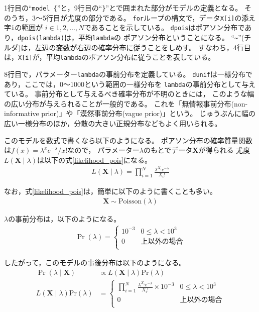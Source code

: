 \documentclass[11pt,uplatex]{jsarticle}
\begin{document}
1行目の``\texttt{model \{}''と，9行目の``\texttt{\}}''とで囲まれた部分がモデルの定義となる。
そのうち，3〜5行目が尤度の部分である。
\texttt{for}ループの構文で，データ\texttt{X[i]}の添え字\texttt{i}の範囲が
$i \in 1, 2, \dots, N$であることを示している。
\texttt{dpois}はポアソン分布であり，\texttt{dpois(lambda)}は，平均\texttt{lambda}の
ポアソン分布ということになる。
``\texttt{\textasciitilde}''(チルダ)は，左辺の変数が右辺の確率分布に従うことをしめす。
すなわち，4行目は，\texttt{X[i]}が，平均\texttt{lambda}のポアソン分布に従うことを表している。

8行目で，パラメーター\texttt{lambda}の事前分布を定義している。
\texttt{dunif}は一様分布であり，ここでは，0〜1000という範囲の一様分布を
\texttt{lambda}の事前分布として与えている。
事前分布として与えるべき確率分布が不明のときには，
このような幅の広い分布が与えられることが一般的である。
これを「無情報事前分布(non-informative prior)」や「漠然事前分布(vague prior)」という。
じゅうぶんに幅の広い一様分布のほか，分散の大きい正規分布などもよく用いられる。

このモデルを数式で書くなら以下のようになる。
ポアソン分布の確率質量関数は$f(x)=\lambda^{x}e^{-\lambda}/x!$なので，
パラメーター$\lambda$のもとでデータ$\bm{X}$が得られる
尤度$L(\bm{X}  \mid  \lambda)$は以下の式\ref{likelihood_pois}になる。
\begin{align}
L(\bm{X} \mid \lambda) = \prod_{i = 1}^{N}\frac{\lambda^{X_{i}}e^{-\lambda}}{X_{i}!}
\label{likelihood_pois}
\end{align}

なお，式\ref{likelihood_pois}は，簡単に以下のように書くことも多い。
\begin{align*}
\bm{X} \sim \mathrm{Poisson}(\lambda)
\end{align*}

$\lambda$の事前分布は，以下のようになる。
\begin{align*}
\Pr(\lambda) = \begin{cases}
 10^{-3} & 0 \leq \lambda  < 10^{3}  \\
 0 & 上以外の場合 \\
\end{cases}
\end{align*}

したがって，このモデルの事後分布は以下のようになる。
\begin{align*}
\Pr(\lambda \mid \bm{X}) &\propto L(\bm{X} \mid \lambda) \mathrm{Pr}(\lambda) \\
L(\bm{X} \mid \lambda) \mathrm{Pr}(\lambda) &=\begin{cases}
 \prod_{i = 1}^{N}\frac{\lambda^{X_{i}}e^{-\lambda}}{X_{i}!} \times 10^{-3} & 0 \leq \lambda  < 10^{3}  \\
 0 & 上以外の場合  \label{posterior} \\
\end{cases}
\end{align*}
\end{document}
